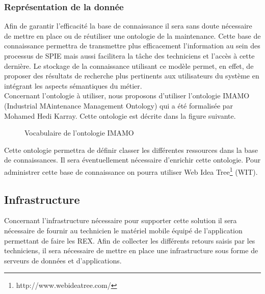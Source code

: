 \subsubsection{Représentation de la donnée}

Afin de garantir l’efficacité la base de connaissance il sera sans doute nécessaire de mettre en place ou de réutiliser une ontologie de la maintenance. Cette base de connaissance permettra de transmettre plus efficacement l’information au sein des processus de SPIE mais aussi facilitera la tâche des techniciens et l’accès à cette dernière. Le stockage de la connaissance utilisant ce modèle permet, en effet, de proposer des résultats de recherche plus pertinents aux utilisateurs du système en intégrant les aspects sémantiques du métier. \\

Concernant l’ontologie à utiliser,  nous proposons d’utiliser l’ontologie IMAMO (Industrial MAintenance Management Ontology) qui a été formalisée par Mohamed Hedi Karray. Cette ontologie est décrite dans la figure suivante. 

\begin{figure}[H]
    \label{fig-imamo}
    \noindent{}
    \caption{Vocabulaire de l'ontologie IMAMO}
\end{figure}

Cette ontologie permettra de définir classer les différentes ressources dans la base de connaissances. Il sera éventuellement nécessaire d’enrichir cette ontologie. Pour administrer cette base de connaissance on pourra utiliser Web Idea Tree\footnote{http://www.webideatree.com/} (WIT).

\subsection{Infrastructure}

Concernant l’infrastructure nécessaire pour supporter cette solution il sera nécessaire de fournir au technicien le matériel mobile équipé de l’application permettant de faire les REX. Afin de collecter les différents retours saisis par les techniciens, il sera nécessaire de mettre en place une infrastructure sous forme de serveurs de données  et d’applications. 

